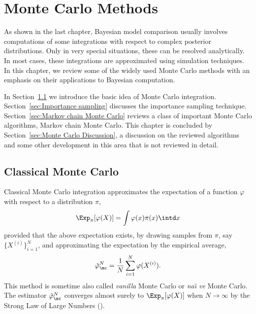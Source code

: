 \chapter{Monte Carlo Methods}
\label{cha:Monte Carlo Methods}

As shown in the last chapter, Bayesian model comparison usually involves
computations of some integrations with respect to complex posterior
distributions. Only in very special situations, these can be resolved
analytically. In most cases, these integrations are approximated using
simulation techniques. In this chapter, we review some of the widely used
Monte Carlo methods with an emphasis on their applications to Bayesian
computation.

In Section~\ref{sec:Classical Monte Carlo} we introduce the basic idea of
Monte Carlo integration. Section~\ref{sec:Importance sampling} discusses the
importance sampling technique. Section~\ref{sec:Markov chain Monte Carlo}
reviews a class of important Monte Carlo algorithms, Markov chain Monte Carlo.
This chapter is concluded by Section~\ref{sec:Monte Carlo Discussion}, a
discussion on the reviewed algorithms and some other development in this area
that is not reviewed in detail.

\section{Classical Monte Carlo}
\label{sec:Classical Monte Carlo}

Classical Monte Carlo integration approximates the expectation of a function
$\varphi$ with respect to a distribution $\pi$,
\begin{equation}
  \Exp_{\pi}[\varphi(X)] = \int\varphi(x)\pi(x)\intd x
\end{equation}
provided that the above expectation exists, by drawing \iid samples from
$\pi$, say $\{X^{(i)}\}_{i=1}^N$, and approximating the expectation by the
empirical average,
\begin{equation}
  \hat\varphi_{\mc}^N = \frac{1}{N}\sum_{i=1}^N\varphi(X^{(i)}).
  \label{eq:vanilla mc}
\end{equation}
This method is sometime also called \emph{vanilla} Monte Carlo or \emph{na\"\i
  ve} Monte Carlo. The estimator $\hat\varphi_{\mc}^N$ converges almost surely
to $\Exp_{\pi}[\varphi(X)]$ when $N\to\infty$ by the Strong Law of Large
Numbers (\slln).

